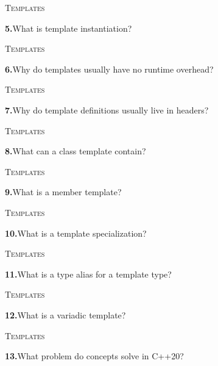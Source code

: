 \documentclass[11pt,a4paper]{article}
\newenvironment{questionblock}{%
  \begin{minipage}[t][0.455\textheight][t]{\textwidth}%
  \raggedright\small
}{%
  \vfill
  \end{minipage}%
}
\newcommand{\sectionlabel}[1]{\textsc{#1}\par\vspace{0.35em}}
\newcommand{\questionnumber}[1]{\textbf{#1.}\enspace}
\begin{document}
\newpage
\begin{questionblock}
\sectionlabel{Templates}
\questionnumber{5}What is template instantiation?\par
\end{questionblock}
\vspace*{0.04\textheight}
\begin{questionblock}
\sectionlabel{Templates}
\questionnumber{6}Why do templates usually have no runtime overhead?\par
\end{questionblock}
\newpage
\begin{questionblock}
\sectionlabel{Templates}
\questionnumber{7}Why do template definitions usually live in headers?\par
\end{questionblock}
\vspace*{0.04\textheight}
\begin{questionblock}
\sectionlabel{Templates}
\questionnumber{8}What can a class template contain?\par
\end{questionblock}
\newpage
\begin{questionblock}
\sectionlabel{Templates}
\questionnumber{9}What is a member template?\par
\end{questionblock}
\vspace*{0.04\textheight}
\begin{questionblock}
\sectionlabel{Templates}
\questionnumber{10}What is a template specialization?\par
\end{questionblock}
\newpage
\begin{questionblock}
\sectionlabel{Templates}
\questionnumber{11}What is a type alias for a template type?\par
\end{questionblock}
\vspace*{0.04\textheight}
\begin{questionblock}
\sectionlabel{Templates}
\questionnumber{12}What is a variadic template?\par
\end{questionblock}
\newpage
\begin{questionblock}
\sectionlabel{Templates}
\questionnumber{13}What problem do concepts solve in C++20?\par
\end{questionblock}
\vspace*{0.04\textheight}
\end{document}
